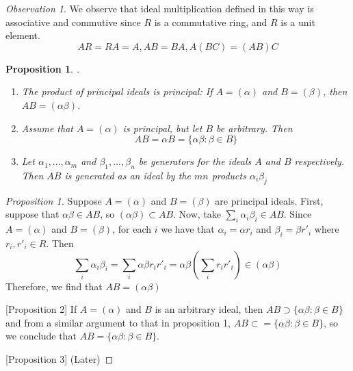 \documentclass[12pt]{article}
\newtheorem{prop}[thm]{Proposition}
\theoremstyle{definition}
\theoremstyle{remark}
\newtheorem{obs}[thm]{Observation}
\numberwithin{equation}{section}
\begin{document}
\vspace{15pt}

\begin{obs}
        We observe that ideal multiplication defined in this way is associative and commutive since $R$ is a commutative ring, and $R$ is a unit element. \begin{equation}
                AR = RA = A, AB = BA, A(BC) = (AB)C
        \end{equation}
\end{obs}

\vspace{15pt}

\begin{prop}
        .\newline\begin{enumerate}
                \item The product of principal ideals is principal: If $A = (\alpha)$ and $B = (\beta)$, then $AB = (\alpha\beta)$.
                \item Assume that $A = (\alpha)$ is principal, but let $B$ be arbitrary. Then \begin{equation}
                                AB = \alpha B = \{\alpha\beta:\beta \in B\}
                \end{equation}
        \item Let $\alpha_1,...,\alpha_m$ and $\beta_1,...,\beta_n$ be generators for the ideals $A$ and $B$ respectively. Then $AB$ is generated as an ideal by the $mn$ products $\alpha_i\beta_j$
        \end{enumerate}
\end{prop}
\begin{proof}
        [Proposition 1] Suppose $A = (\alpha)$ and $B = (\beta)$ are principal ideals. First, suppose that $\alpha\beta \in AB$, so $(\alpha\beta) \subset AB$. Now, take $\sum_{i}\alpha_i\beta_i \in AB$. Since $A = (\alpha)$ and $B = (\beta)$, for each $i$ we have that $\alpha_i = \alpha r_i$ and $\beta_i = \beta r'_i$ where $r_i,r'_i \in R$. Then \begin{equation}
                \sum\limits_{i}\alpha_i\beta_i = \sum\limits_i \alpha\beta r_ir'_i = \alpha\beta\left(\sum\limits_ir_ir'_i\right) \in (\alpha\beta)
        \end{equation}
        Therefore, we find that $AB = (\alpha\beta)$



        [Proposition 2] If $A = (\alpha)$ and $B$ is an arbitrary ideal, then $AB \supset \{\alpha\beta:\beta \in B\}$ and from a similar argument to that in proposition 1, $AB \subset = \{\alpha\beta:\beta \in B\}$, so we conclude that $AB = \{\alpha\beta:\beta \in B\}$.
        


        [Proposition 3] (Later)
\end{proof}
\end{document}

